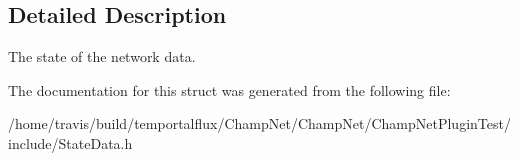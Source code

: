 \subsection{Detailed Description}
The state of the network data. 

The documentation for this struct was generated from the following file\-:\begin{DoxyCompactItemize}
\item 
/home/travis/build/temportalflux/\-Champ\-Net/\-Champ\-Net/\-Champ\-Net\-Plugin\-Test/include/State\-Data.\-h\end{DoxyCompactItemize}
